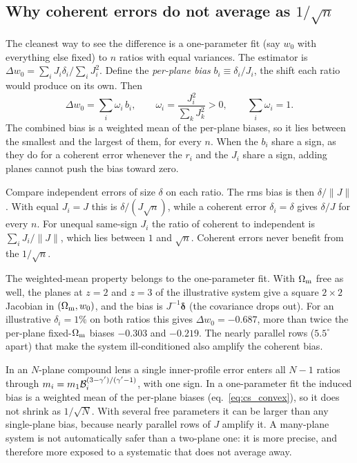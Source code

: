 \subsection{Why coherent errors do not average as $1/\sqrt{n}$}

The cleanest way to see the difference is a one-parameter fit (say $w_0$
with everything else fixed) to $n$ ratios with equal variances. The
estimator is $\Delta w_0=\sum_iJ_i\delta_i/\sum_iJ_i^2$. Define the
\emph{per-plane bias} $b_i\equiv\delta_i/J_i$, the shift each ratio
would produce on its own. Then
\begin{equation}
  \Delta w_0=\sum_i\omega_i\,b_i,\qquad
  \omega_i=\frac{J_i^2}{\sum_kJ_k^2}>0,\qquad\sum_i\omega_i=1 .
  \label{eq:cs_convex}
\end{equation}
The combined bias is a weighted mean of the per-plane biases, so
it lies between the smallest and the largest of them, for every $n$.
When the $b_i$ share a sign, as they do for a coherent error whenever
the $r_i$ and the $J_i$ share a sign, adding planes cannot push the bias
toward zero.

Compare independent errors of size $\delta$ on each ratio. The rms bias
is then $\delta/\lVert J\rVert$. With equal $J_i=J$ this is
$\delta/(J\sqrt n)$, while a coherent error $\delta_i=\delta$ gives
$\delta/J$ for every $n$. For unequal same-sign $J_i$ the ratio of
coherent to independent is $\sum_iJ_i/\lVert J\rVert$, which lies
between $1$ and $\sqrt n$. Coherent errors never benefit from the
$1/\sqrt n$.

The weighted-mean property belongs to the one-parameter fit. With
$\Omega_{\mathrm{m}}$ free as well, the planes at $z=2$ and $z=3$ of the illustrative
system give a square $2\times2$ Jacobian in $(\Omega_{\mathrm{m}},w_0)$, and the bias
is $J^{-1}\bm{\delta}$ (the covariance drops out). For an illustrative
$\delta_i=1\%$ on both ratios this gives $\Delta w_0=-0.687$, more than
twice the per-plane fixed-$\Omega_{\mathrm{m}}$ biases $-0.303$ and $-0.219$. The
nearly parallel rows ($5.5^\circ$ apart) that make the system
ill-conditioned also amplify the coherent bias.

\begin{keybox}
In an $N$-plane compound lens a single inner-profile error enters all
$N-1$ ratios through $m_i=m_1\mathcal{B}_i^{(3-\gamma')/(\gamma'-1)}$, with one
sign. In a one-parameter fit the induced bias is a weighted mean of the
per-plane biases (eq.~\ref{eq:cs_convex}), so it does not shrink as
$1/\sqrt{N}$. With several free parameters it can be larger than any
single-plane bias, because nearly parallel rows of $J$ amplify it. A
many-plane system is not automatically safer than a
two-plane one: it is more precise, and therefore more exposed to a
systematic that does not average away.
\end{keybox}

